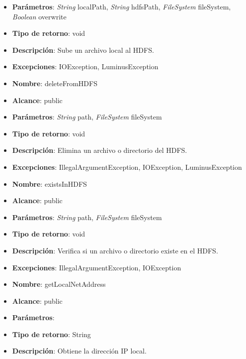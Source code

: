 \begin{UClist}
\begin{itemize}
		\item \textbf{Parámetros}: \emph{String} localPath, \emph{String} hdfsPath, \emph{FileSystem} fileSystem, \emph{Boolean} overwrite
		\item \textbf{Tipo de retorno}: void
		\item \textbf{Descripción}: Sube un archivo local al HDFS.
		\item \textbf{Excepciones}: IOException, LuminusException\\
	\end{itemize}
	\begin{itemize}
		\item \textbf{Nombre}: deleteFromHDFS
		\item \textbf{Alcance}: public
		\item \textbf{Parámetros}: \emph{String} path, \emph{FileSystem} fileSystem
		\item \textbf{Tipo de retorno}: void
		\item \textbf{Descripción}: Elimina un archivo o directorio del HDFS.
		\item \textbf{Excepciones}: IllegalArgumentException, IOException, LuminusException\\
	\end{itemize}
	\begin{itemize}
		\item \textbf{Nombre}: existsInHDFS
		\item \textbf{Alcance}: public
		\item \textbf{Parámetros}: \emph{String} path, \emph{FileSystem} fileSystem
		\item \textbf{Tipo de retorno}: void
		\item \textbf{Descripción}: Verifica si un archivo o directorio existe en el HDFS.
		\item \textbf{Excepciones}: IllegalArgumentException, IOException\\
	\end{itemize}
	\begin{itemize}
		\item \textbf{Nombre}: getLocalNetAddress
		\item \textbf{Alcance}: public
		\item \textbf{Parámetros}:
		\item \textbf{Tipo de retorno}: String
		\item \textbf{Descripción}: Obtiene la dirección IP local.\\
	\end{itemize}
	\begin{itemize}

\end{itemize}
\end{UClist}
